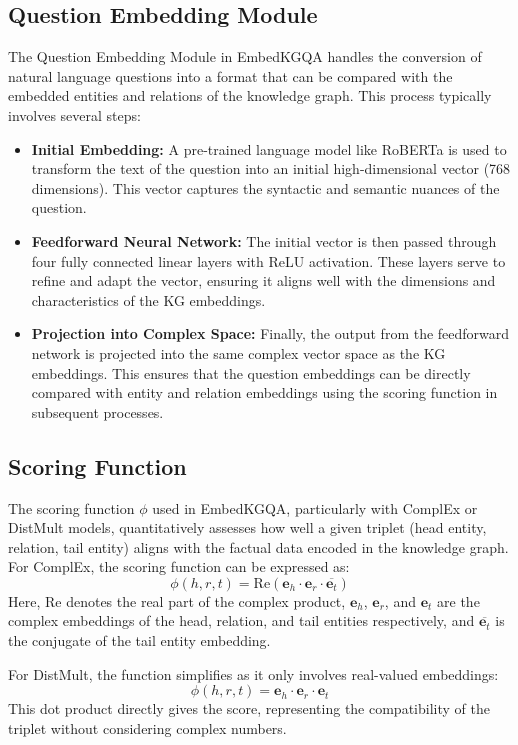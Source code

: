 \documentclass[12pt]{article}
\begin{document}
\subsection{Question Embedding Module}
The Question Embedding Module in EmbedKGQA handles the conversion of natural language questions into a format that can be compared with the embedded entities and relations of the knowledge graph. This process typically involves several steps:
\begin{itemize}
    \item \textbf{Initial Embedding:} A pre-trained language model like RoBERTa is used to transform the text of the question into an initial high-dimensional vector (768 dimensions). This vector captures the syntactic and semantic nuances of the question.
    \item \textbf{Feedforward Neural Network:} The initial vector is then passed through four fully connected linear layers with ReLU activation. These layers serve to refine and adapt the vector, ensuring it aligns well with the dimensions and characteristics of the KG embeddings.
    \item \textbf{Projection into Complex Space:} Finally, the output from the feedforward network is projected into the same complex vector space as the KG embeddings. This ensures that the question embeddings can be directly compared with entity and relation embeddings using the scoring function in subsequent processes.
\end{itemize}

\subsection{Scoring Function}
The scoring function $\phi$ used in EmbedKGQA, particularly with ComplEx or DistMult models, quantitatively assesses how well a given triplet (head entity, relation, tail entity) aligns with the factual data encoded in the knowledge graph. For ComplEx, the scoring function can be expressed as:
\[
\phi(h, r, t) = \text{Re}(\mathbf{e}_h \cdot \mathbf{e}_r \cdot \overline{\mathbf{e}_t})
\]
Here, $\text{Re}$ denotes the real part of the complex product, $\mathbf{e}_h$, $\mathbf{e}_r$, and $\mathbf{e}_t$ are the complex embeddings of the head, relation, and tail entities respectively, and $\overline{\mathbf{e}_t}$ is the conjugate of the tail entity embedding.

For DistMult, the function simplifies as it only involves real-valued embeddings:
\[
\phi(h, r, t) = \mathbf{e}_h \cdot \mathbf{e}_r \cdot \mathbf{e}_t
\]
This dot product directly gives the score, representing the compatibility of the triplet without considering complex numbers.
\end{document}
